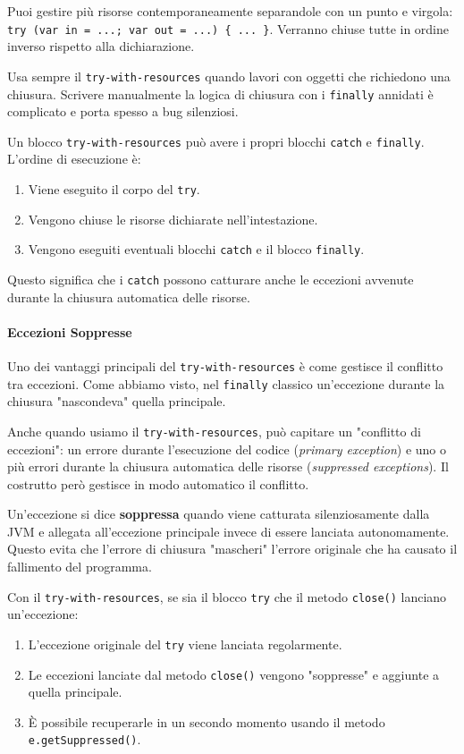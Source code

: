 \begin{tip}
Puoi gestire più risorse contemporaneamente separandole con un punto e virgola:
\texttt{try (var in = ...; var out = ...) \{ ... \}}. Verranno chiuse tutte in ordine inverso rispetto alla dichiarazione.
\end{tip}

\begin{tip}
Usa sempre il \texttt{try-with-resources} quando lavori con oggetti che richiedono una chiusura. Scrivere manualmente la logica di chiusura con i \texttt{finally} annidati è complicato e porta spesso a bug silenziosi.
\end{tip}

Un blocco \texttt{try-with-resources} può avere i propri blocchi \texttt{catch} e \texttt{finally}. L'ordine di esecuzione è:
\begin{enumerate}
    \item Viene eseguito il corpo del \texttt{try}.
    \item Vengono chiuse le risorse dichiarate nell'intestazione.
    \item Vengono eseguiti eventuali blocchi \texttt{catch} e il blocco \texttt{finally}.
\end{enumerate}
Questo significa che i \texttt{catch} possono catturare anche le eccezioni avvenute durante la chiusura automatica delle risorse.

\paragraph{Eccezioni Soppresse}
Uno dei vantaggi principali del \texttt{try-with-resources} è come gestisce il conflitto tra eccezioni. Come abbiamo visto, nel \texttt{finally} classico un'eccezione durante la chiusura "nascondeva" quella principale.

Anche quando usiamo il \texttt{try-with-resources}, può capitare un "conflitto di eccezioni": un errore durante l'esecuzione del codice (\textit{primary exception}) e uno o più errori durante la chiusura automatica delle risorse (\textit{suppressed exceptions}). Il costrutto però gestisce in modo automatico il conflitto. 

Un'eccezione si dice \textbf{soppressa} quando viene catturata silenziosamente dalla JVM e allegata all'eccezione principale invece di essere lanciata autonomamente. Questo evita che l'errore di chiusura "mascheri" l'errore originale che ha causato il fallimento del programma.

Con il \texttt{try-with-resources}, se sia il blocco \texttt{try} che il metodo \texttt{close()} lanciano un'eccezione:
\begin{enumerate}
    \item L'eccezione originale del \texttt{try} viene lanciata regolarmente.
    \item Le eccezioni lanciate dal metodo \texttt{close()} vengono "soppresse" e aggiunte a quella principale.
    \item È possibile recuperarle in un secondo momento usando il metodo \texttt{e.getSuppressed()}.
\end{enumerate}

